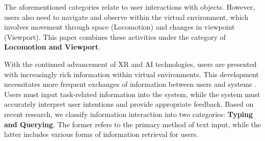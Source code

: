 \documentclass[review]{fcs}
\begin{document}
The aforementioned categories relate to user interactions with objects. However, users also need to navigate and observe within the virtual environment, which involves movement through space ({Locomotion}) and changes in viewpoint ({Viewport}). This paper combines these activities under the category of \textbf{Locomotion and Viewport}.

With the continued advancement of XR and AI technologies, users are presented with increasingly rich information within virtual environments. This development necessitates more frequent exchanges of information between users and systems \cite{DBLP:journals/imwut/WangSWYYWJXY24}. Users must input task-related information into the system, while the system must accurately interpret user intentions and provide appropriate feedback. Based on recent research, we classify information interaction into two categories: \textbf{Typing and Querying}. The former refers to the primary method of text input, while the latter includes various forms of information retrieval for users.


\end{document}
